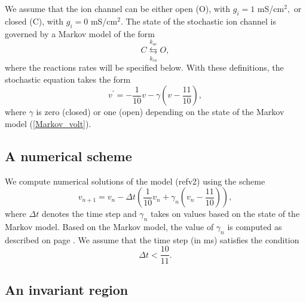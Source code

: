 We assume that the ion channel can be either open (O), with $g_{i}=1$ mS/cm$^{2},$ or
closed (C), with $g_{i}=0$ mS/cm$^{2}$. The state of the stochastic ion channel is governed
by a Markov model of the form
\begin{equation}
C\underset{k_{co}}{\overset{k_{oc}}{\leftrightarrows}}O, \label{Markov_volt}
\end{equation}
where the reactions rates will be specified below. With these definitions, the
stochastic equation takes the form
\begin{equation}
v^{\prime}=-\frac{1}{10}v-\gamma\left(  v-\frac{11}{10}\right),  \label{v2}
\end{equation}
where $\gamma$ is zero (closed) or one (open) depending on the state of the Markov model (\ref{Markov_volt}).

\subsection{A numerical scheme}

We compute numerical solutions of the model (ref{v2}) using
the scheme
\begin{equation}
v_{n+1}=v_{n}-\Delta t\left(  \frac{1}{10}v_{n}+\gamma_{n}\left(  v_{n}
-\frac{11}{10}\right)  \right)  \label{vs},
\end{equation}
where $\Delta t$ denotes the time step and $\gamma_{n}$ takes on values
based on the state of the Markov model. Based on the Markov model, the value
of $\gamma_{n}$ is computed as described on page \pageref{numscheme}. We assume that
the time step (in ms) satisfies the condition
\begin{equation}
\Delta t<\frac{10}{11}. \label{vdt}
\end{equation}



\subsection{An invariant region}

